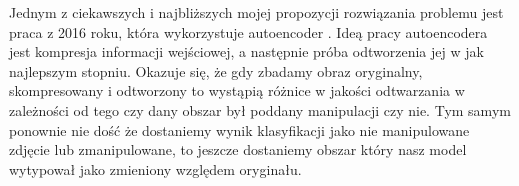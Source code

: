 Jednym z ciekawszych i najbliższych mojej propozycji rozwiązania problemu jest praca z 2016 roku, która wykorzystuje autoencoder \cite{auto}. Ideą pracy autoencodera jest kompresja informacji wejściowej, a następnie próba odtworzenia jej w jak najlepszym stopniu. Okazuje się, że gdy zbadamy obraz oryginalny, skompresowany i odtworzony to wystąpią różnice w jakości odtwarzania w zależności od tego czy dany obszar był poddany manipulacji czy nie. Tym samym ponownie nie dość że dostaniemy wynik klasyfikacji jako nie manipulowane zdjęcie lub zmanipulowane, to jeszcze dostaniemy obszar który nasz model wytypował jako zmieniony względem oryginału.